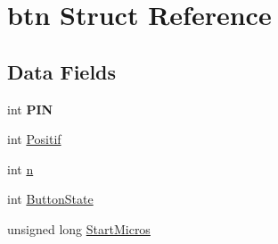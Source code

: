 \hypertarget{structbtn}{
\section{btn Struct Reference}
\label{structbtn}
}
\subsection*{Data Fields}
\begin{DoxyCompactItemize}
\item 
\hypertarget{structbtn_a60ceee771129fb0eae4be0fa950bb28d}{
int {\bfseries PIN}}
\label{structbtn_a60ceee771129fb0eae4be0fa950bb28d}

\item 
int \hyperlink{structbtn_a615f75574814cdcb377ea3db29cbccea}{Positif}
\item 
int \hyperlink{structbtn_ad9e4b266624b0c71e42c0b41df8a7efa}{n}
\item 
int \hyperlink{structbtn_a24d7bca6e4bf616c6967cec7c2b4dc3d}{ButtonState}
\item 
unsigned long \hyperlink{structbtn_a92a5840b5ed25eec3b9f9b58e19c555d}{StartMicros}
\end{DoxyCompactItemize}


